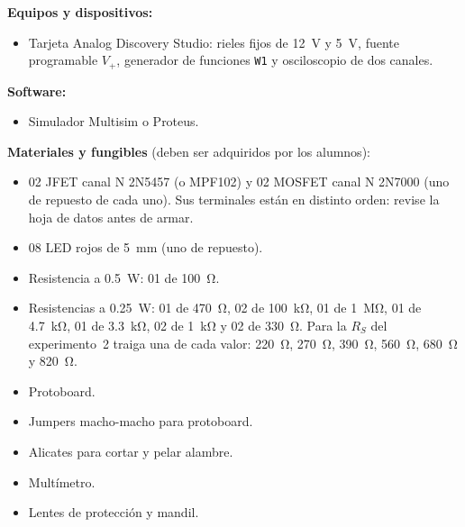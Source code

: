 \documentclass[11pt,a4paper]{article}
\let\needspace\Needspace
\begin{document}
\vspace{0.25cm}
\noindent\textbf{Equipos y dispositivos:}
\begin{itemize}
    \item Tarjeta Analog Discovery Studio: rieles fijos de \qty{+12}{\volt} y
          \qty{+5}{\volt}, fuente programable $V_+$, generador de funciones \texttt{W1} y
          osciloscopio de dos canales.
\end{itemize}

\noindent\textbf{Software:}
\begin{itemize}
    \item Simulador Multisim o Proteus.
\end{itemize}

\vspace{0.25cm}
\needspace{6\baselineskip}
\noindent\textbf{Materiales y fungibles} (deben ser adquiridos por los alumnos):
\begin{itemize}
    \item 02 JFET canal N 2N5457 (o MPF102) y 02 MOSFET canal N 2N7000 (uno de repuesto de
          cada uno). Sus terminales están en distinto orden: revise la hoja de datos antes de
          armar.
    \item 08 LED rojos de \qty{5}{\milli\metre} (uno de repuesto).
    \item Resistencia a \qty{0.5}{\watt}: 01 de \qty{100}{\ohm}.
    \item Resistencias a \qty{0.25}{\watt}:
          01 de \qty{470}{\ohm},
          02 de \qty{100}{\kilo\ohm},
          01 de \qty{1}{\mega\ohm},
          01 de \qty{4.7}{\kilo\ohm},
          01 de \qty{3.3}{\kilo\ohm},
          02 de \qty{1}{\kilo\ohm} y
          02 de \qty{330}{\ohm}.
          Para la $R_S$ del experimento~2 traiga una de cada valor:
          \qty{220}{\ohm}, \qty{270}{\ohm}, \qty{390}{\ohm}, \qty{560}{\ohm},
          \qty{680}{\ohm} y \qty{820}{\ohm}.
    \item Protoboard.
    \item Jumpers macho-macho para protoboard.
    \item Alicates para cortar y pelar alambre.
    \item Multímetro.
    \item Lentes de protección y mandil.
\end{itemize}
\end{document}
